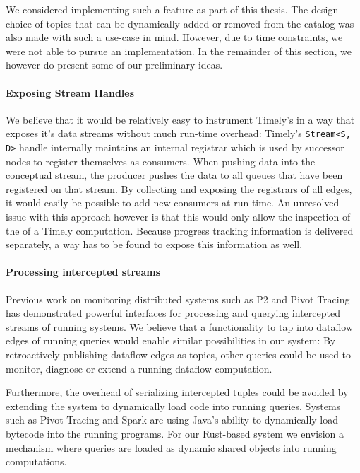We considered implementing such a feature as part
of this thesis. The design choice of topics that can be dynamically added
or removed from the catalog was also made with such a use-case in mind.
However, due to time constraints, we were not able to pursue an implementation.
In the remainder of this section, we however do present some of our
preliminary ideas.

\paragraph{Exposing Stream Handles}

We believe that it would be relatively easy to instrument Timely's in a way
that exposes it's data streams without much run-time overhead: Timely's
\lstinline{Stream<S, D>} handle internally maintains an internal
registrar which is used by successor nodes to register themselves as consumers.
When pushing data into the conceptual stream, the producer pushes the data to
all queues that have been registered on that stream. By collecting and exposing
the registrars of all edges, it would easily be possible to add new consumers
at run-time. An unresolved issue with this approach however is that this would only allow
the inspection of the  of a Timely computation. Because
progress tracking information is delivered separately, a way has to be found to
expose this information as well.

\paragraph{Processing intercepted streams}

Previous work on monitoring distributed systems such as P2 \cite{p2} and
Pivot Tracing \cite{pivot} has demonstrated powerful interfaces for
processing and querying intercepted streams of running systems.
We believe that a functionality to tap into dataflow edges of running queries would
enable similar possibilities in our system: By retroactively publishing
dataflow edges as topics, other queries could be used to monitor, diagnose or
extend a running dataflow computation.

Furthermore, the overhead of serializing intercepted tuples could be avoided
by extending the system to dynamically load code into running queries. Systems
such as Pivot Tracing and Spark are using Java's ability to dynamically load
bytecode into the running programs. For our Rust-based system we envision a
mechanism where queries are loaded as dynamic shared objects into running
computations.

